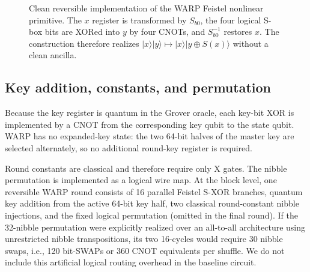 \documentclass[pdflatex,sn-nature]{sn-jnl}
\providecommand{\ket}[1]{\lvert #1\rangle}
\newcommand{\Sb}{S_{b0}}
\theoremstyle{thmstyleone}
\theoremstyle{thmstyletwo}
\begin{document}
\begin{figure}[tbp]
\centering
{}
\caption{Clean reversible implementation of the WARP Feistel nonlinear primitive. The $x$ register is transformed by $\Sb$, the four logical S-box bits are XORed into $y$ by four CNOTs, and $\Sb^{-1}$ restores $x$. The construction therefore realizes $\ket{x}\ket{y}\mapsto\ket{x}\ket{y\oplus S(x)}$ without a clean ancilla.}
\label{fig:sxor_circuit}
\end{figure}

\subsection{Key addition, constants, and permutation}
Because the key register is quantum in the Grover oracle, each key-bit XOR is implemented by a CNOT from the corresponding key qubit to the state qubit. WARP has no expanded-key state: the two 64-bit halves of the master key are selected alternately, so no additional round-key register is required.

Round constants are classical and therefore require only X gates. The nibble permutation is implemented as a logical wire map. At the block level, one reversible WARP round consists of 16 parallel Feistel S-XOR branches, quantum key addition from the active 64-bit key half, two classical round-constant nibble injections, and the fixed logical permutation (omitted in the final round). If the 32-nibble permutation were explicitly realized over an all-to-all architecture using unrestricted nibble transpositions, its two 16-cycles would require 30 nibble swaps, i.e., 120 bit-SWAPs or 360 CNOT equivalents per shuffle. We do not include this artificial logical routing overhead in the baseline circuit.
\end{document}

